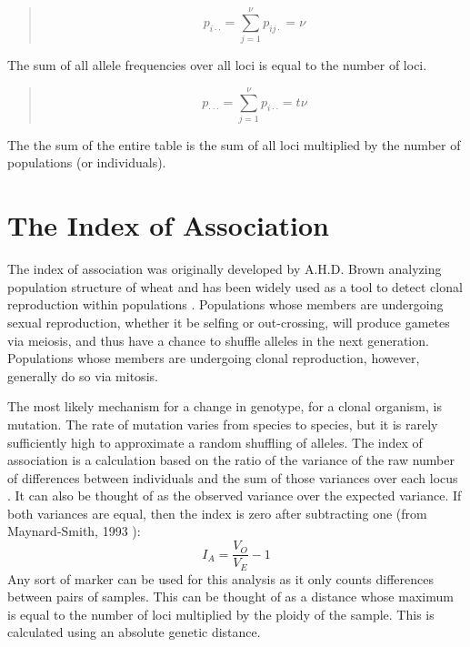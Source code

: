 \documentclass[letterpaper]{article}\usepackage[]{graphicx}\usepackage[]{color}
\begin{document}
\begin{quote}
\begin{equation}
p_{i{\cdot}\cdot}=\sum_{j=1}^{\nu}p_{ij\cdot}=\nu
\end{equation}
\end{quote}
The sum of all allele frequencies over all loci is equal to the number of loci.

\begin{quote} 
\begin{equation}
p_{{\cdot}{\cdot}\cdot}=\sum_{j=1}^{\nu}p_{i{\cdot}\cdot}=t\nu
\end{equation}
\end{quote}
The the sum of the entire table is the sum of all loci multiplied by the number 
of populations (or individuals).




\section{The Index of Association}
\label{indexassoc}

The index of association was originally developed by A.H.D. Brown analyzing
population structure of wheat and has been widely used as a tool to detect
clonal reproduction within populations \citep{Brown:1980, Smith:1993}.
Populations whose members are undergoing sexual reproduction, whether it be
selfing or out-crossing, will produce gametes via meiosis, and thus have a
chance to shuffle alleles in the next generation. Populations whose members are
undergoing clonal reproduction, however, generally do so via mitosis.

The most likely mechanism for a change in genotype, for a clonal organism, is 
mutation. The rate of mutation varies from species to species, but it is rarely
sufficiently high to approximate a random shuffling of alleles. The index of
association is a calculation based on the ratio of the variance of the raw
number of differences between individuals and the sum of those variances over
each locus \citep{Smith:1993}. It can also be thought of as the observed variance
over the expected variance. If both variances are equal, then the index is zero
after subtracting one (from Maynard-Smith, 1993 \citep{Smith:1993}):
\begin{equation}
\label{eq:I_A}
I_A = \frac{V_O}{V_E}-1
\end{equation}
Any sort of marker can be used for this analysis as it only counts differences
between pairs of samples. This can be thought of as a distance whose maximum is
equal to the number of loci multiplied by the ploidy of the sample. This is
calculated using an absolute genetic distance.
\end{document}
